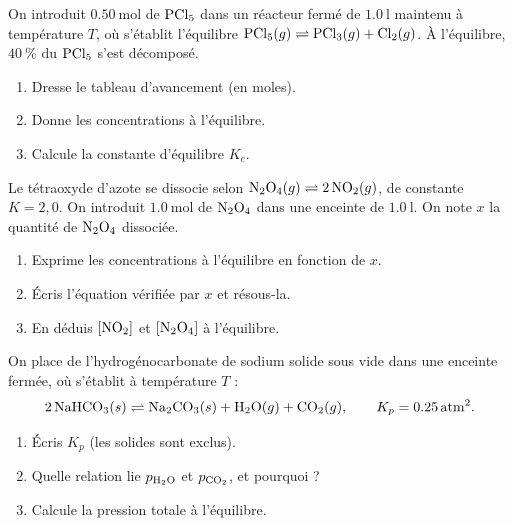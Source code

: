 \documentclass[11pt,a4paper]{article}
\begin{document}
\begin{exo}
On introduit $\qty{0.50}{\mol}$ de $\ce{PCl5}$ dans un réacteur fermé de $\qty{1.0}{\litre}$ maintenu à température $T$, où s'établit l'équilibre $\ce{PCl5}(g) \rightleftharpoons \ce{PCl3}(g) + \ce{Cl2}(g)$. À l'équilibre, $\qty{40}{\percent}$ du $\ce{PCl5}$ s'est décomposé.
\begin{enumerate}[label=\alph*)]
  \item Dresse le tableau d'avancement (en moles).
  \item Donne les concentrations à l'équilibre.
  \item Calcule la constante d'équilibre $K_c$.
\end{enumerate}
\end{exo}

\begin{exo}
Le tétraoxyde d'azote se dissocie selon $\ce{N2O4}(g) \rightleftharpoons 2\,\ce{NO2}(g)$, de constante $K=2{,}0$. On introduit $\qty{1.0}{\mol}$ de $\ce{N2O4}$ dans une enceinte de $\qty{1.0}{\litre}$. On note $x$ la quantité de $\ce{N2O4}$ dissociée.
\begin{enumerate}[label=\alph*)]
  \item Exprime les concentrations à l'équilibre en fonction de $x$.
  \item Écris l'équation vérifiée par $x$ et résous-la.
  \item En déduis $[\ce{NO2}]$ et $[\ce{N2O4}]$ à l'équilibre.
\end{enumerate}
\end{exo}

\begin{exo}
On place de l'hydrogénocarbonate de sodium solide sous vide dans une enceinte fermée, où s'établit à température $T$ :
\[ 2\,\ce{NaHCO3}(s) \rightleftharpoons \ce{Na2CO3}(s) + \ce{H2O}(g) + \ce{CO2}(g),\qquad K_p = \qty{0.25}{atm\squared}. \]
\begin{enumerate}[label=\alph*)]
  \item Écris $K_p$ (les solides sont exclus).
  \item Quelle relation lie $p_{\ce{H2O}}$ et $p_{\ce{CO2}}$, et pourquoi ?
  \item Calcule la pression totale à l'équilibre.
\end{enumerate}
\end{exo}
\end{document}

